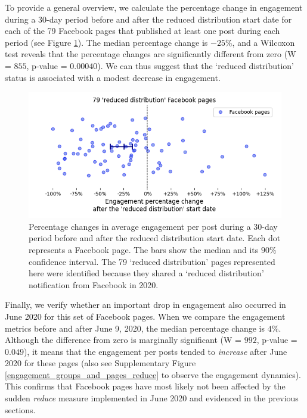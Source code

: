 \documentclass[review]{elsarticle}
\begin{document}
{{To provide a general overview, we calculate the percentage change in engagement during a 30-day period before and after the reduced distribution start date for each of the 79 Facebook pages that published at least one post during each period (see Figure \ref{reduce_percentage_change}).
The median percentage change is $-25\%$, and a Wilcoxon test reveals that the percentage changes are significantly different from zero (W = $855$, p-value = $0.00040$).
We can thus suggest that the `reduced distribution' status is associated with a modest decrease in engagement.

\begin{figure}[!h]
\centering
\includegraphics[scale=0.5]{./../figure/reduce_percentage_change.png}
\caption{
Percentage changes in average engagement per post during a 30-day period before and after the reduced distribution start date. 
Each dot represents a Facebook page. 
The bars show the median and its $90\%$ confidence interval.
The 79 `reduced distribution' pages represented here were identified because they shared a `reduced distribution' notification from Facebook in 2020.
}
\label{reduce_percentage_change}
\end{figure}
 
Finally, we verify whether an important drop in engagement also occurred in June 2020 for this set of Facebook pages.
When we compare the engagement metrics before and after June 9, 2020, the median percentage change is $4\%$. Although the difference from zero is marginally significant (W = $992$, p-value = $0.049$), it means that the engagement per posts tended to {\it increase} after June 2020 for these pages (also see Supplementary Figure \ref{engagement_groups_and_pages_reduce} to observe the engagement dynamics).
This confirms that Facebook pages have most likely not been affected by the sudden {\it reduce} measure implemented in June 2020 and evidenced in the previous sections.

}}
\end{document}

